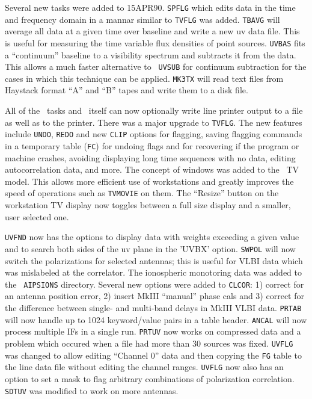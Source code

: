 
Several new tasks were added to 15APR90.  {\tt SPFLG} which edits data
in the time and frequency domain in a mannar similar to {\tt TVFLG}
was added.  {\tt TBAVG} will average all data at a given time over
baseline and write a new uv data file.  This is useful for measuring
the time variable flux densities of point sources.  {\tt UVBAS} fits a
``continuum'' baseline to a visibility spectrum and subtracts
it from the data.  This allows a much faster alternative to {\tt
UVSUB} for continuum subtraction for the cases in which this technique
can be applied.  {\tt MK3TX} will read text files from
Haystack format ``A'' and ``B'' tapes and write them to a disk file.


All of the \AIPS\ tasks and \AIPS\ itself can now optionally write
line printer output to a file as well as to the printer.  There was a
major upgrade to {\tt TVFLG}.  The new features include {\tt UNDO},
{\tt REDO} and new {\tt CLIP} options for flagging, saving flagging
commands in a temporary table ({\tt FC}) for undoing flags and for
recovering if the program or machine crashes, avoiding displaying long
time sequences with no data, editing autocorrelation data, and more.
The concept of windows was added to the \AIPS\ TV model.  This allows
more efficient use of workstations and greatly improves the speed of
operations such as {\tt TVMOVIE} on them.  The ``Resize'' button on
the workstation TV display now toggles between a full size display and
a smaller, user selected one.

\vfil\eject
{\tt UVFND} now has the options to display data with weights exceeding
a given value and to search both sides of the uv plane in the 'UVBX'
option.  {\tt SWPOL} will now switch the polarizations for selected
antennas; this is useful for VLBI data which was mislabeled at the
correlator.  The ionospheric monotoring data was added to the {\tt
AIPSIONS} directory.  Several new options were added to {\tt CLCOR}:
1) correct for an antenna position error, 2) insert MkIII ``manual''
phase cals and 3) correct for the difference between single- and
multi-band delays in MkIII VLBI data. {\tt PRTAB} will now handle up
to 1024 keyword/value pairs in a table header.  {\tt ANCAL} will now
process multiple IFs in a single run.  {\tt PRTUV} now works on
compressed data and a problem which occured when a file had more than
30 sources was fixed.  {\tt UVFLG} was changed to allow editing
``Channel 0'' data and then copying the {\tt FG} table to the line
data file without editing the channel ranges.  {\tt UVFLG} now also
has an option to set a mask to flag arbitrary combinations of
polarization correlation.  {\tt SDTUV} was modified to work on more
antennas.

